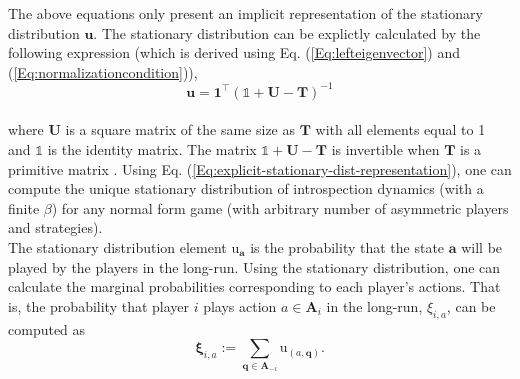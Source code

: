 \documentclass[11pt]{article}
\theoremstyle{plainCl1}
\theoremstyle{plainCl2}
\newcommand{\A}{\mathbf{A}}
\newcommand{\abf}{\mathbf{a}}
\newcommand{\qbf}{\mathbf{q}}
\newcommand{\T}{\mathbf{T}}
\newcommand{\ubf}{\mathbf{u}}
\begin{document}
\noindent The above equations only present an implicit representation of the stationary distribution $\ubf$. The stationary distribution can be explictly calculated by the following expression (which is derived using Eq. (\ref{Eq:lefteigenvector}) and (\ref{Eq:normalizationcondition})),
\begin{equation}
\ubf = \mathbf{1}^\intercal (\mathbb{1} + \mathbf{U} - \T)^{-1}
\label{Eq:explicit-stationary-dist-representation}
\end{equation} \\
where $\mathbf{U}$ is a square matrix of the same size as $\T$ with all elements equal to 1 and $\mathbb{1}$ is the identity matrix. The matrix $\mathbb{1} + \mathbf{U} - \T$ is invertible when $\T$ is a primitive matrix \cite{Couto:NJP:2022}. Using Eq. (\ref{Eq:explicit-stationary-dist-representation}), one can compute the unique stationary distribution of introspection dynamics (with a finite $\beta$) for any normal form game (with arbitrary number of asymmetric players and strategies).\\

\noindent The stationary distribution element $\mathrm{u}_\abf$ is the probability that the state $\abf$ will be played by the players in the long-run. Using the stationary distribution, one can calculate the marginal probabilities corresponding to each player's actions. That is, the probability that player $i$ plays action $a \in \A_i$ in the long-run, $\xi_{i,a}$, can be computed as
\begin{equation}
\mathbf{\xi}_{i,a} := \sum_{\qbf \in \A_{-i}} \mathrm{u}_{(a, \qbf)}.
\label{Eq:marginal-definition}
\end{equation}
\end{document}
